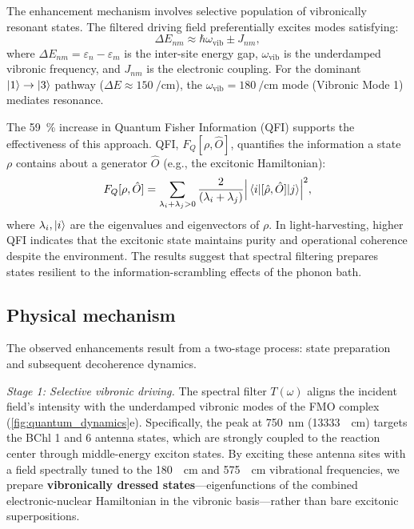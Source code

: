 \documentclass[journal=jpcl,manuscript=letter]{achemso}
\begin{document}
The enhancement mechanism involves selective population of vibronically resonant states. The filtered driving field preferentially excites modes satisfying:
\begin{equation}
\Delta E_{nm} \approx \hbar\omega_{\mathrm{vib}} \pm J_{nm},
\label{eq:resonance_condition}
\end{equation}
where $\Delta E_{nm} = \varepsilon_n - \varepsilon_m$ is the inter-site energy gap, $\omega_{\mathrm{vib}}$ is the underdamped vibronic frequency, and $J_{nm}$ is the electronic coupling. For the dominant $\ket{1} \to \ket{3}$ pathway ($\Delta E \approx \SI{150}{\per\centi\meter}$), the $\omega_{\mathrm{vib}} = \SI{180}{\per\centi\meter}$ mode (Vibronic Mode 1) mediates resonance.\cite{Chin2013,Fleming2015,Scholes2015}

The \SI{59}{\percent} increase in Quantum Fisher Information (QFI) supports the effectiveness of this approach. QFI, $F_Q[\rho, \hat{O}]$, quantifies the information a state $\rho$ contains about a generator $\hat{O}$ (e.g., the excitonic Hamiltonian):
\begin{equation}
F_Q[\rho, \hat{O}] = \sum_{\lambda_i + \lambda_j > 0} \frac{2}{(\lambda_i + \lambda_j)} \abs{\mel{i}{[\hat{\rho}, \hat{O}]}{j}}^2,
\label{eq:QFI}
\end{equation}
where $\lambda_i, \ket{i}$ are the eigenvalues and eigenvectors of $\rho$. In light-harvesting, higher QFI indicates that the excitonic state maintains purity and operational coherence despite the environment.\cite{Pezze2009} The results suggest that spectral filtering prepares states resilient to the information-scrambling effects of the phonon bath.

\subsection*{Physical mechanism}

The observed enhancements result from a two-stage process: state preparation and subsequent decoherence dynamics. 

\textit{Stage 1: Selective vibronic driving.} The spectral filter $T(\omega)$ aligns the incident field's intensity with the underdamped vibronic modes of the FMO complex (\cref{fig:quantum_dynamics}e). Specifically, the peak at \SI{750}{\nano\meter} (\SI{13333}{\per\centi\meter}) targets the BChl 1 and 6 antenna states, which are strongly coupled to the reaction center through middle-energy exciton states. By exciting these antenna sites with a field spectrally tuned to the \SI{180}{\per\centi\meter} and \SI{575}{\per\centi\meter} vibrational frequencies, we prepare \textbf{vibronically dressed states}---eigenfunctions of the combined electronic-nuclear Hamiltonian in the vibronic basis\cite{Womick2015,Sanda2022}---rather than bare excitonic superpositions.
\end{document}
